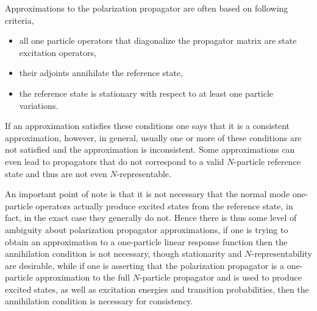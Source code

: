 \documentclass[12pt,aps,amsfonts,amssymb,tightenlines]{revtex4}%
\begin{document}
Approximations to the polarization propagator are often based on following criteria,

\begin{itemize}
\item all one particle operators that diagonalize the propagator matrix are
state excitation operators,

\item their adjoints annihilate the reference state,

\item the reference state is stationary with respect to at least one particle variations.
\end{itemize}

If an approximation satisfies these conditions one says that it is a
consistent approximation, however, in general, usually one or more of these
conditions are not satisfied and the approximation is inconsistent. Some
approximations can even lead to propagators that do not correspond to a valid
$N$-particle reference state and thus are not even $N$-representable.

An important point of note is that it is not necessary that the normal mode
one-particle operators actually produce excited states from the reference
state, in fact, in the exact case they generally do not. Hence there is thus
some level of ambiguity about polarization propagator approximations, if one
is trying to obtain an approximation to a one-particle linear response
function then the annihilation condition is not necessary, though stationarity
and $N$-representability are desirable, while if one is asserting that the
polarization propagator is a one-particle approximation to the full
$N$-particle propagator and is used to produce excited states, as well as
excitation energies and transition probabilities, then the annihilation
condition is necessary for consistency.
\end{document}
